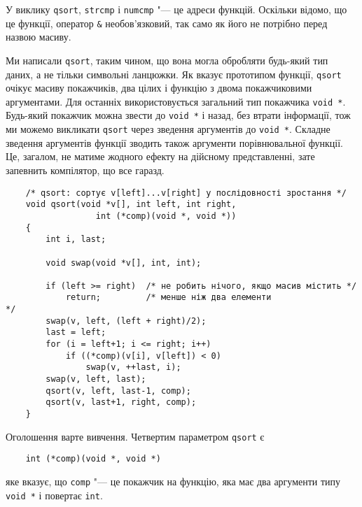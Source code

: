 \documentclass[a4paper,12pt]{book}
\begin{document}
  У виклику \texttt{qsort}, \texttt{strcmp} і \texttt{numcmp} "--- це адреси функцій.
  Оскільки відомо, що це функції, оператор \texttt{\&} необов'язковий, так само як його
  не потрібно перед назвою масиву.

  Ми написали \texttt{qsort}, таким чином, що вона могла обробляти будь-який тип даних, а
  не тільки символьні ланцюжки. Як вказує прототипом функції, \texttt{qsort} очікує масиву
  покажчиків, два цілих і функцію з двома покажчиковими аргументами. Для останніх
  використовується загальний тип покажчика \texttt{void *}. Будь-який покажчик можна
  звести до \texttt{void *} і назад, без втрати інформації, тож ми можемо викликати
  \texttt{qsort} через зведення аргументів до \texttt{void *}. Складне зведення аргументів
  функції зводить також аргументи порівнювальної функції. Це, загалом, не матиме жодного
  ефекту на дійсному представленні, зате запевнить компілятор, що все гаразд.

  \begin{verbatim}
    /* qsort: сортує v[left]...v[right] у послідовності зростання */
    void qsort(void *v[], int left, int right,
                  int (*comp)(void *, void *))
    {
        int i, last;

        void swap(void *v[], int, int);

        if (left >= right)  /* не робить нічого, якщо масив містить */
            return;         /* менше ніж два елементи                    */
        swap(v, left, (left + right)/2);
        last = left;
        for (i = left+1; i <= right; i++)
            if ((*comp)(v[i], v[left]) < 0)
                swap(v, ++last, i);
        swap(v, left, last);
        qsort(v, left, last-1, comp);
        qsort(v, last+1, right, comp);
    }
  \end{verbatim}

  Оголошення варте вивчення. Четвертим параметром \texttt{qsort} є
  \begin{verbatim}
    int (*comp)(void *, void *)
  \end{verbatim}
  яке вказує, що \texttt{comp} "--- це покажчик на функцію, яка має два аргументи типу
  \texttt{void *} і повертає \texttt{int}.
\end{document}
